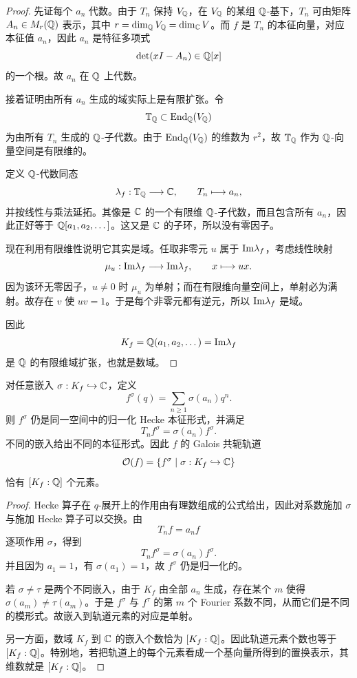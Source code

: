 \begin{proof}
先证每个 $a_n$ 代数。由于 $T_n$ 保持 $V_{\mathbb{Q}}$，在 $V_{\mathbb{Q}}$ 的某组 $\mathbb{Q}$-基下，$T_n$ 可由矩阵 $A_n\in M_r(\mathbb{Q})$ 表示，其中 $r=\dim_{\mathbb{Q}}V_{\mathbb{Q}}=\dim_{\mathbb{C}}V$。而 $f$ 是 $T_n$ 的本征向量，对应本征值 $a_n$，因此 $a_n$ 是特征多项式
\[
\det(xI-A_n)\in\mathbb{Q}[x]
\]
的一个根。故 $a_n$ 在 $\mathbb{Q}$ 上代数。

接着证明由所有 $a_n$ 生成的域实际上是有限扩张。令
\[
\mathbb{T}_{\mathbb{Q}}\subset \mathrm{End}_{\mathbb{Q}}(V_{\mathbb{Q}})
\]
为由所有 $T_n$ 生成的 $\mathbb{Q}$-子代数。由于 $\mathrm{End}_{\mathbb{Q}}(V_{\mathbb{Q}})$ 的维数为 $r^2$，故 $\mathbb{T}_{\mathbb{Q}}$ 作为 $\mathbb{Q}$-向量空间是有限维的。

定义 $\mathbb{Q}$-代数同态
\[
\lambda_f:\mathbb{T}_{\mathbb{Q}}\longrightarrow \mathbb{C},
\qquad T_n\longmapsto a_n,
\]
并按线性与乘法延拓。其像是 $\mathbb{C}$ 的一个有限维 $\mathbb{Q}$-子代数，而且包含所有 $a_n$，因此正好等于 $\mathbb{Q}[a_1,a_2,\dots]$。这又是 $\mathbb{C}$ 的子环，所以没有零因子。

现在利用有限维性说明它其实是域。任取非零元 $u$ 属于 $\mathrm{Im}\lambda_f$，考虑线性映射
\[
\mu_u:\mathrm{Im}\lambda_f\longrightarrow \mathrm{Im}\lambda_f,
\qquad x\longmapsto ux.
\]
因为该环无零因子，$u\ne0$ 时 $\mu_u$ 为单射；而在有限维向量空间上，单射必为满射。故存在 $v$ 使 $uv=1$。于是每个非零元都有逆元，所以 $\mathrm{Im}\lambda_f$ 是域。

因此
\[
K_f=\mathbb{Q}(a_1,a_2,\dots)=\mathrm{Im}\lambda_f
\]
是 $\mathbb{Q}$ 的有限维域扩张，也就是数域。
\end{proof}

\begin{proposition}
对任意嵌入 $\sigma:K_f\hookrightarrow \mathbb{C}$，定义
\[
f^\sigma(q)=\sum_{n\ge1}\sigma(a_n)q^n.
\]
则 $f^\sigma$ 仍是同一空间中的归一化 Hecke 本征形式，并满足
\[
T_n f^\sigma=\sigma(a_n)f^\sigma.
\]
不同的嵌入给出不同的本征形式。因此 $f$ 的 Galois 共轭轨道
\[
\mathcal O(f)=\{f^\sigma\mid \sigma:K_f\hookrightarrow\mathbb{C}\}
\]
恰有 $[K_f:\mathbb{Q}]$ 个元素。
\end{proposition}

\begin{proof}
Hecke 算子在 $q$-展开上的作用由有理数组成的公式给出，因此对系数施加 $\sigma$ 与施加 Hecke 算子可以交换。由
\[
T_n f=a_n f
\]
逐项作用 $\sigma$，得到
\[
T_n f^\sigma=\sigma(a_n)f^\sigma.
\]
并且因为 $a_1=1$，有 $\sigma(a_1)=1$，故 $f^\sigma$ 仍是归一化的。

若 $\sigma\ne\tau$ 是两个不同嵌入，由于 $K_f$ 由全部 $a_n$ 生成，存在某个 $m$ 使得 $\sigma(a_m)\ne\tau(a_m)$。于是 $f^\sigma$ 与 $f^\tau$ 的第 $m$ 个 Fourier 系数不同，从而它们是不同的模形式。故嵌入到轨道元素的对应是单射。

另一方面，数域 $K_f$ 到 $\mathbb{C}$ 的嵌入个数恰为 $[K_f:\mathbb{Q}]$。因此轨道元素个数也等于 $[K_f:\mathbb{Q}]$。特别地，若把轨道上的每个元素看成一个基向量所得到的置换表示，其维数就是 $[K_f:\mathbb{Q}]$。
\end{proof}

